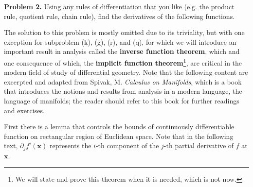 \documentclass[10pt]{article}
\begin{document}
\textbf{Problem 2.} Using any rules of differentiation that you like (e.g. the product rule, quotient rule, chain rule), find the derivatives of the following functions.

The solution to this problem is mostly omitted due to its triviality, but with one exception for subproblem (k), (g), (r), and (q), for which we will introduce an important result in analysis called the \textbf{inverse function theorem}, which and one consequence of which, the \textbf{implicit function theorem}\footnote{We will state and prove this theorem when it is needed, which is not now.}, are critical in the modern field of study of differential geometry. Note that the following content are excerpted and adapted from Spivak, M. \textit{Calculus on Manifolds}, which is a book that introduces the notions and results from analysis in a modern language, the language of manifolds; the reader should refer to this book for further readings and exercises.

First there is a lemma that controls the bounds of continuously differentiable function on rectangular region of Euclidean space. Note that in the following text, $\partial_jf^i(\mathbf{x})$ represents the $i$-th component of the $j$-th partial derivative of $f$ at $\mathbf{x}$.
\end{document}

